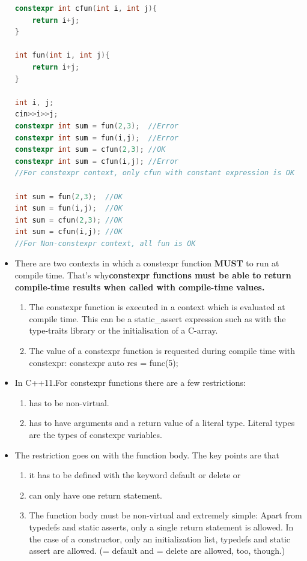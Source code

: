 \documentclass[a4paper,12pt,twoside]{book}
\begin{document}
\begin{itemize}
	
\begin{lstlisting}[frame=single, language=c++]	
constexpr int cfun(int i, int j){
	return i+j;
}

int fun(int i, int j){
	return i+j;
}

int i, j;
cin>>i>>j;
constexpr int sum = fun(2,3);  //Error
constexpr int sum = fun(i,j);  //Error
constexpr int sum = cfun(2,3); //OK
constexpr int sum = cfun(i,j); //Error
//For constexpr context, only cfun with constant expression is OK

int sum = fun(2,3);  //OK
int sum = fun(i,j);  //OK
int sum = cfun(2,3); //OK
int sum = cfun(i,j); //OK
//For Non-constexpr context, all fun is OK
\end{lstlisting}		
	
	\item There are two contexts in which a constexpr function \textbf{MUST} to run at compile time. That's why\textbf{constexpr functions must be able to return compile-time results when called with compile-time values.}
	\begin{enumerate}
		\item The constexpr function is executed in a context which is evaluated at compile time. This can be a static\_assert expression such as with the type-traits library or the initialisation of a C-array.
		\item The value of a constexpr function is requested during compile time with constexpr: constexpr auto res = func(5);
	\end{enumerate}

	\item In C++11.For constexpr functions there are a few restrictions:
	\begin{enumerate}
		\item has to be non-virtual.
		\item has to have arguments and a return value of a literal type. Literal types are the types of constexpr variables.
	\end{enumerate}


	\item The restriction goes on with the function body. The key points are that
	\begin{enumerate}
		\item it has to be defined with the keyword default or delete or
		\item can only have one return statement.
		
		\item The function body must be non-virtual and extremely simple: Apart from typedefs and static asserts, only a single return statement is allowed. In the case of a constructor, only an initialization list, typedefs and static assert are allowed. (= default and = delete are allowed, too, though.)
		

\end{enumerate}
\end{itemize}
\end{document}
